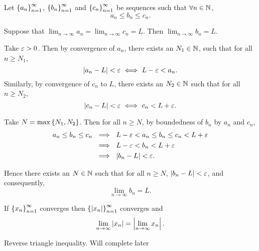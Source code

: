 \documentclass[12pt]{article}
\theoremstyle{definition}
\renewenvironment{proof}[1][\proofname]{\vspace{-10pt}\begin{replacementproof}}{\end{replacementproof}}
\newcommand{\nlim}{\lim_{n\rightarrow\infty}}
\begin{document}
    \begin{theorem}
        Let $\left\{a_{n}\right\}_{n = 1}^{\infty}$, $\left\{b_{n}\right\}_{n = 1}^{\infty}$ and $\left\{c_{n}\right\}_{n = 1}^{\infty}$ be sequences such that $\forall n \in \mathbb{N}$,
        \begin{equation*}
            a_{n} \leq b_{n} \leq c_{n}.
        \end{equation*}

        Suppose that $\displaystyle\lim_{n \rightarrow \infty}a_{n} = \displaystyle\lim_{n \rightarrow \infty}c_{n} = L$. Then $\displaystyle\lim_{n \rightarrow \infty}b_{n} = L$.
    \end{theorem}
    \begin{proof}
        Take $\varepsilon > 0$. Then by convergence of $a_{n}$, there exists an $N_{1} \in \mathbb{N}$, such that for all $n \geq N_{1}$, 
        \begin{equation*}
            \left|a_{n} - L\right| < \varepsilon ~ \Longleftrightarrow ~ L - \varepsilon < a_{n}.
        \end{equation*}
        Similarly, by convergence of $c_{n}$ to $L$, there exists an $N_{2} \in \mathbb{N}$ such that for all $n \geq N_{2}$, 
        \begin{equation*}
            \left|c_{n} - L\right| < \varepsilon ~ \Longleftrightarrow ~ c_{n} < L + \varepsilon. 
        \end{equation*}

        Take $N = \max\left\{N_{1}, N_{2}\right\}$. Then for all $n \geq N$, by boundedness of $b_{n}$ by $a_{n}$ and $c_{n}$,
        \begin{align*}
            a_{n} \leq b_{n} \leq c_{n} ~ &\implies ~ L - \varepsilon < a_{n} \leq b_{n} \leq c_{n} < L + \varepsilon \\
                                          &\implies ~ L - \varepsilon < b_{n} < L + \varepsilon \\
                                          &\implies ~ \left|b_n - L\right| < \varepsilon.
        \end{align*}

        Hence there exists an $N \in \mathbb{N}$ such that for all $n \geq N$, $\left|b_{n} - L\right| < \varepsilon$, and consequently, 
        \begin{equation*}
            \nlim b_{n} = L.
        \end{equation*}
    \end{proof}
    \begin{prop}
        If $\left\{x_{n}\right\}_{n = 1}^{\infty}$ converges then $\left\{\left|x_{n}\right|\right\}_{n = 1}^{\infty}$ converges and 
        \begin{equation}
            \lim_{n \rightarrow \infty}\left|x_{n}\right| = \left|\lim_{n \rightarrow \infty}x_{n}\right|.
        \end{equation}
    \end{prop}
    \begin{proof}
        Reverse triangle inequality. Will complete later
    \end{proof}
\end{document}
